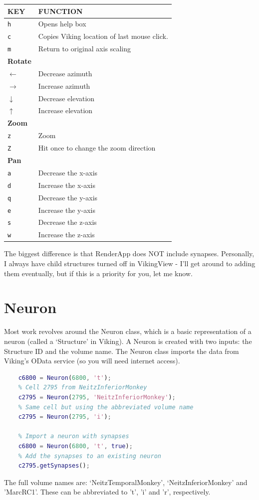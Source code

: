 \documentclass[12pt]{exam}
\begin{document}
	\begin{center}
	\begin{tabular}{|l l|}
		\hline
		\textbf{KEY} & \textbf{FUNCTION}\\
		\hline
		\texttt{h} & Opens help box\\
		\texttt{c} & Copies Viking location of last mouse click.\\
		\texttt{m} & Return to original axis scaling\\
		\hline
		\textbf{Rotate} & \\
		\texttt{$\leftarrow$} & Decrease azimuth\\
		\texttt{$\rightarrow$} & Increase azimuth\\
		\texttt{$\downarrow$} & Decrease elevation\\
		\texttt{$\uparrow$} & Increase elevation\\
		\hline
		\textbf{Zoom} & \\
		\texttt{z} & Zoom\\
		\texttt{Z} & Hit once to change the zoom direction\\
		\hline
		\textbf{Pan} & \\
		\texttt{a} & Decrease the x-axis\\
		\texttt{d} & Increase the x-axis\\
		\texttt{q} & Decrease the y-axis\\
		\texttt{e} & Increase the y-axis\\
		\texttt{s} & Decrease the z-axis\\
		\texttt{w} & Increase the z-axis\\
		\hline
	\end{tabular}
	\end{center}
	
	The biggest difference is that RenderApp does NOT include synapses. Personally, I always have child structures turned off in VikingView - I'll get around to adding them eventually, but if this is a priority for you, let me know.
	\section{Neuron}
	Most work revolves around the Neuron class, which is a basic representation of a neuron (called a `Structure' in Viking). A Neuron is created with two inputs: the Structure ID and the volume name. The Neuron class imports the data from Viking's OData service (so you will need internet access).
	\begin{lstlisting}[language=matlab]
	% Cell 6800 from NeitzTemporalMonkey
	c6800 = Neuron(6800, 't');
	% Cell 2795 from NeitzInferiorMonkey
	c2795 = Neuron(2795, 'NeitzInferiorMonkey');
	% Same cell but using the abbreviated volume name
	c2795 = Neuron(2795, 'i');
	
	% Import a neuron with synapses
	c6800 = Neuron(6800, 't', true);
	% Add the synapses to an existing neuron
	c2795.getSynapses();\end{lstlisting}
	The full volume names are: `NeitzTemporalMonkey', `NeitzInferiorMonkey' and 'MarcRC1'. These can be abbreviated to 't', 'i' and 'r', respectively.
\end{document}

